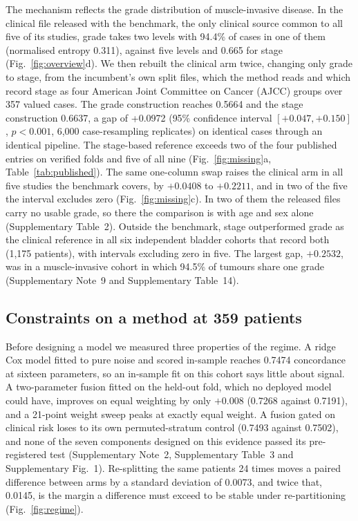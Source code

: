 \documentclass[pdflatex,sn-nature]{sn-jnl}
\begin{document}
The mechanism reflects the grade distribution of muscle-invasive disease. In the clinical file released with the benchmark, the
only clinical source common to all five of its studies, grade takes two levels with 94.4\% of cases
in one of them (normalised entropy 0.311), against five levels and 0.665 for stage
(Fig.~\ref{fig:overview}d). We then rebuilt the clinical arm twice, changing only grade to stage,
from the incumbent's own split files, which the method reads and which record stage as four American
Joint Committee on Cancer (AJCC) groups over 357 valued cases. The grade construction reaches 0.5664 and the stage construction 0.6637, a
gap of +0.0972 (95\% confidence interval $[+0.047, +0.150]$, $p<0.001$, 6,000 case-resampling
replicates) on identical cases through an identical pipeline. The stage-based reference exceeds two of the four published entries on verified folds and five of all nine
(Fig.~\ref{fig:missing}a, Table~\ref{tab:published}). The same one-column swap raises the clinical
arm in all five studies the benchmark covers, by $+0.0408$ to $+0.2211$, and in two of the five the
interval excludes zero (Fig.~\ref{fig:missing}c). In two of them the released
files carry no usable grade, so there the comparison is with age and sex alone (Supplementary
Table~2). Outside the benchmark, stage outperformed grade as the clinical reference in all six
independent bladder cohorts that record both (1,175 patients), with intervals excluding zero in five. The largest gap, $+0.2532$, was in a muscle-invasive cohort in which
94.5\% of tumours share one grade (Supplementary Note~9 and Supplementary Table~14).

\subsection*{Constraints on a method at 359 patients}

Before designing a model we measured three properties of the regime. A ridge Cox model fitted to
pure noise and scored in-sample reaches 0.7474 concordance at sixteen parameters, so an in-sample
fit on this cohort says little about signal. A two-parameter fusion fitted on the held-out fold,
which no deployed model could have, improves on equal weighting by only $+0.008$ (0.7268 against
0.7191), and a 21-point weight sweep peaks at exactly equal weight. A fusion gated on
clinical risk loses to its own permuted-stratum control (0.7493 against 0.7502), and none of the seven
components designed on this evidence passed its pre-registered test (Supplementary Note~2,
Supplementary Table~3 and Supplementary Fig.~1). Re-splitting the
same patients 24 times moves a paired difference between arms by a standard deviation of 0.0073, and
twice that, 0.0145, is the margin a difference must exceed to be stable under re-partitioning
(Fig.~\ref{fig:regime}).
\end{document}
